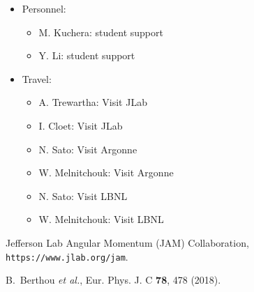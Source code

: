 \documentclass{article}[12pt,preprint]
\begin{document}
\begin{itemize}

\item Personnel:

  \begin{itemize}
  \item M. Kuchera: student support
  \item Y. Li: student support
  \end{itemize}

\item Travel:

  \begin{itemize}
  \item A. Trewartha:  Visit JLab
  \item I. Cloet: Visit JLab
  \item N. Sato:  Visit Argonne 
  \item W. Melnitchouk: Visit Argonne 
  \item N. Sato:  Visit LBNL 
  \item W. Melnitchouk: Visit LBNL
  \end{itemize}

\end{itemize}





\begin{thebibliography}{99}

Jefferson Lab Angular Momentum (JAM) Collaboration,
{\tt https://www.jlab.org/jam}.

B.~Berthou {\it et al.},
Eur. Phys. J. C {\bf 78}, 478 (2018).

\end{thebibliography}
\end{document}
